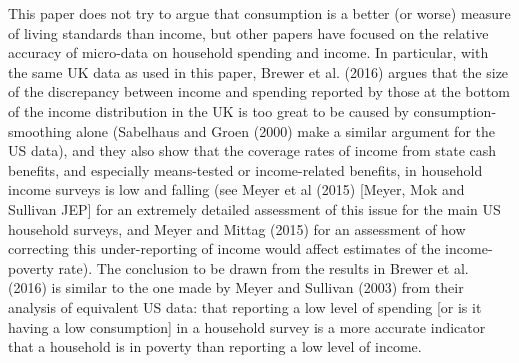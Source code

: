 

This paper does not try to argue that consumption is a better (or worse) measure of living standards than income, but other papers have focused on the relative accuracy of micro-data on household spending and income. In particular, with the same UK data as used in this paper, Brewer et al. (2016) argues that the size of the discrepancy between income and spending reported by those at the bottom of the income distribution in the UK is too great to be caused by consumption-smoothing alone (Sabelhaus and Groen (2000) make a similar argument for the US data), and they also show that the coverage rates of income from state cash benefits, and especially means-tested or income-related benefits, in household income surveys is low and falling (see Meyer et al (2015) [Meyer, Mok and Sullivan JEP] for an extremely detailed assessment of this issue for the main US household surveys, and Meyer and Mittag (2015) for an assessment of how correcting this under-reporting of income would affect estimates of the income-poverty rate). The conclusion to be drawn from the results in Brewer et al. (2016) is similar to the one made by Meyer and Sullivan (2003) from their analysis of equivalent US data: that reporting a low level of spending [or is it having a low consumption] in a household survey is a more accurate indicator that a household is in poverty than reporting a low level of income.  

